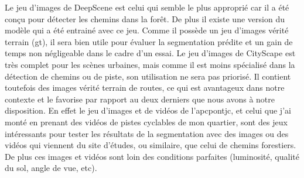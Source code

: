 ﻿\par Le jeu d'images de DeepScene est celui qui semble le plus approprié car il a été conçu pour détecter les chemins dans la forêt. De plus il existe une version du modèle qui a été entrainé avec ce jeu. Comme il possède un jeu d'images vérité terrain (\acrshort{gt}), il sera bien utile pour évaluer la segmentation prédite et un gain de temps non négligeable dans le cadre d'un essai. Le jeu d'images de CityScape est très complet pour les scènes urbaines, mais comme il est moins spécialisé dans la détection de chemins ou de piste, son utilisation ne sera pas priorisé. Il contient toutefois des images vérité terrain de routes, ce qui est avantageux dans notre contexte et le favorise par rapport au deux derniers que nous avons à notre disposition. En effet le jeu d'images et de vidéos de l'\acrshort{apcpontjc}, et celui que j'ai monté en prenant des vidéos de pistes cyclables de mon quartier, sont des jeux intéressants pour tester les résultats de la segmentation avec des images ou des vidéos qui viennent du site d'études, ou similaire, que celui de chemins forestiers. De plus ces images et vidéos sont loin des conditions parfaites (luminosité, qualité du sol, angle de vue, etc).

